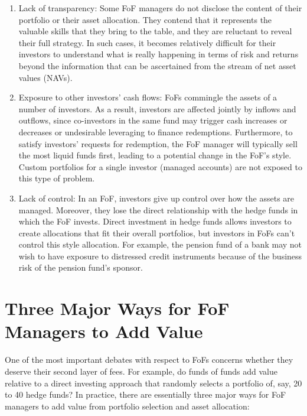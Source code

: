 \documentclass[11pt]{article}
\begin{document}
\begin{enumerate}
  \item Lack of transparency: Some FoF managers do not disclose the content of their portfolio or their asset allocation. They contend that it represents the valuable skills that they bring to the table, and they are reluctant to reveal their full strategy. In such cases, it becomes relatively difficult for their investors to understand what is really happening in terms of risk and returns beyond the information that can be ascertained from the stream of net asset values (NAVs).

  \item Exposure to other investors' cash flows: FoFs commingle the assets of a number of investors. As a result, investors are affected jointly by inflows and outflows, since co-investors in the same fund may trigger cash increases or decreases or undesirable leveraging to finance redemptions. Furthermore, to satisfy investors' requests for redemption, the FoF manager will typically sell the most liquid funds first, leading to a potential change in the FoF's style. Custom portfolios for a single investor (managed accounts) are not exposed to this type of problem.

  \item Lack of control: In an FoF, investors give up control over how the assets are managed. Moreover, they lose the direct relationship with the hedge funds in which the FoF invests. Direct investment in hedge funds allows investors to create allocations that fit their overall portfolios, but investors in FoFs can't control this style allocation. For example, the pension fund of a bank may not wish to have exposure to distressed credit instruments because of the business risk of the pension fund's sponsor.

\end{enumerate}

\section*{Three Major Ways for FoF Managers to Add Value}
One of the most important debates with respect to FoFs concerns whether they deserve their second layer of fees. For example, do funds of funds add value relative to a direct investing approach that randomly selects a portfolio of, say, 20 to 40 hedge funds? In practice, there are essentially three major ways for FoF managers to add value from portfolio selection and asset allocation:
\end{document}
